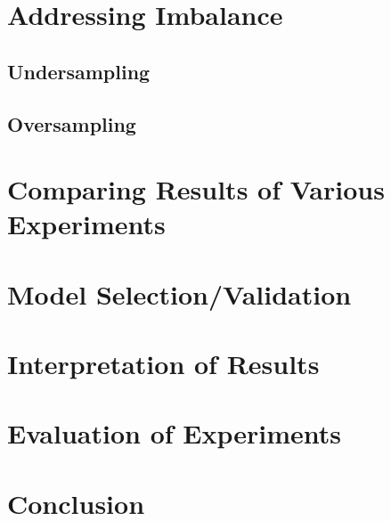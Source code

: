 \section{Addressing Imbalance}
\subsection{Undersampling}
\subsection{Oversampling}

\section{Comparing Results of Various Experiments}

\section{Model Selection/Validation}

\section{Interpretation of Results}

\section{Evaluation of Experiments}

\section{Conclusion}